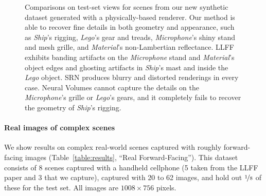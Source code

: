\documentclass[runningheads]{llncs}
\newcommand{\scenename}[1]{\textit{#1}}
\begin{document}
\begin{figure}[t]
\begin{tabular}{@{}c@{}c@{}c@{}c@{}c@{}c@{}}
\end{tabular} 
\caption{Comparisons on test-set views for scenes from our new synthetic dataset generated with a physically-based renderer. Our method is able to recover fine details in both geometry and appearance, such as \scenename{Ship}'s rigging, \scenename{Lego}'s gear and treads, \scenename{Microphone}'s shiny stand and mesh grille, and \scenename{Material}'s non-Lambertian reflectance. LLFF exhibits banding artifacts on the \scenename{Microphone} stand and \scenename{Material}'s object edges and ghosting artifacts in \scenename{Ship}'s mast and inside the \scenename{Lego} object. SRN produces blurry and distorted renderings in every case. Neural Volumes cannot capture the details on the \scenename{Microphone}'s grille or \scenename{Lego}'s gears, and it completely fails to recover the geometry of \scenename{Ship}'s rigging.}
\label{fig:synthresults}
\end{figure} 

\paragraph{\textbf{Real images of complex scenes}}

We show results on complex real-world scenes captured with roughly forward-facing images (Table~\ref{table:results}, ``Real Forward-Facing''). This dataset consists of 8 scenes captured with a handheld cellphone (5 taken from the LLFF paper and 3 that we capture), captured with 20 to 62 images, and hold out $\nicefrac{1}{8}$ of these for the test set. All images are $1008 \times 756$ pixels.




\renewcommand{\resultsfigwidth}{1.27in}
\renewcommand{\resultscropwidth}{0.84in}


\newcommand{\cropfern}[1]{
  \makecell{
\texttt{[image: \#1]} \\
  \texttt{[image: \#1]} 
  }
}

\newcommand{\croporchid}[1]{
  \makecell{
\texttt{[image: \#1]} \\
  \texttt{[image: \#1]} 
  }
}



\newcommand{\cropredtrex}[1]{
  \makecell{
\texttt{[image: \#1]}   \\
  \texttt{[image: \#1]} 
  }
}
\end{document}
